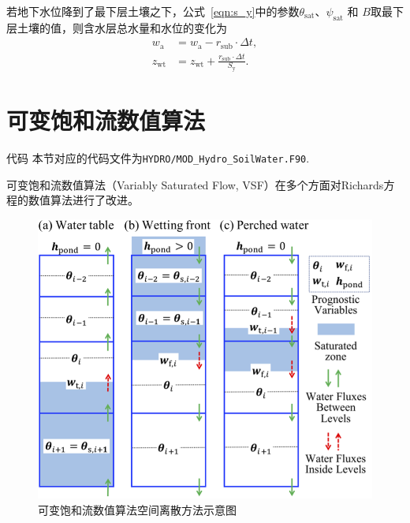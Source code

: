若地下水位降到了最下层土壤之下，公式~\eqref{eqn:s_y}中的参数$\theta_{\mathrm {sat}} $、$\psi_{\mathrm {sat}} $ 和 $B$取最下层土壤的值，则含水层总水量和水位的变化为
\begin{equation}
  \begin{aligned}
    w_{\mathrm{a}} & = w_{\mathrm{a}} - r_{\mathrm{sub}} \cdot \Delta t, \\
    z_{\mathrm{wt}} & = z_{\mathrm{w t}}+\frac{r_{\mathrm{sub}} \cdot \Delta t}{S_{\mathrm{y}}}.
  \end{aligned}
\end{equation}

\section{可变饱和流数值算法}

\begin{mymdframed}{代码}
  本节对应的代码文件为\texttt{HYDRO/MOD\_Hydro\_SoilWater.F90}.
\end{mymdframed}

可变饱和流数值算法（Variably Saturated Flow, VSF）\citep{dai2019vsf}在多个方面对Richards方程的数值算法进行了改进。

{
  \begin{figure}[htbp]
    \centering
    \includegraphics{Figures/陆地表面的水分循环/可变饱和流数值算法预报区域空间结构示意图.png}
    \caption{可变饱和流数值算法空间离散方法示意图}
    \label{fig:可变饱和流数值算法预报区域空间结构示意图}
  \end{figure}
}

